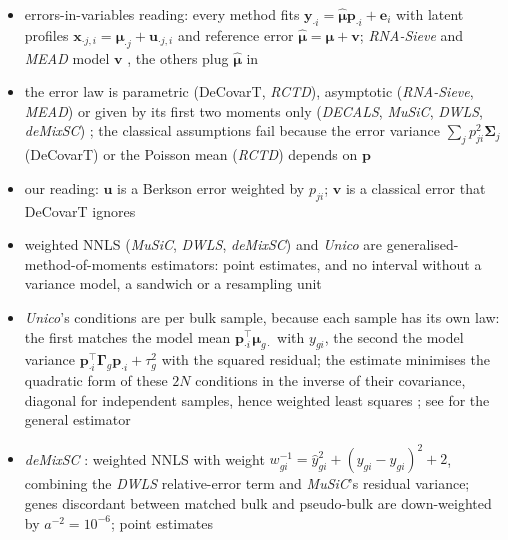 \begin{itemize}
  \item errors-in-variables reading: every method fits \(\boldsymbol{y}_{\cdot i}=\hat{\boldsymbol{\mu}}\boldsymbol{p}_{\cdot i}+\boldsymbol{e}_{i}\) with latent
        profiles \(\boldsymbol{x}_{\cdot j,i}=\boldsymbol{\mu}_{\cdot j}+\boldsymbol{u}_{\cdot j,i}\) and reference error
        \(\hat{\boldsymbol{\mu}}=\boldsymbol{\mu}+\boldsymbol{v}\); \emph{RNA-Sieve} and \emph{MEAD} model \(\boldsymbol{v}\)
        \cite{erdmann-phamLikelihoodbasedDeconvolutionBulk2021,xieStatisticalInferenceCell2026}, the others plug
        \(\hat{\boldsymbol{\mu}}\) in
  \item the error law is parametric (DeCovarT, \emph{RCTD}), asymptotic (\emph{RNA-Sieve}, \emph{MEAD}) or given by its
        first two moments only (\emph{DECALS}, \emph{MuSiC}, \emph{DWLS}, \emph{deMixSC})
        \cite{agrestiFoundationsLinearGeneralized2015}; the classical assumptions fail because the error variance
        \(\sum_{j}p_{ji}^{2}\boldsymbol{\Sigma}_{j}\) (DeCovarT) or the Poisson mean (\emph{RCTD}) depends on \(\boldsymbol{p}\)
  \item our reading: \(\boldsymbol{u}\) is a Berkson error weighted by \(p_{ji}\); \(\boldsymbol{v}\) is a classical error that
        DeCovarT ignores
  \item weighted NNLS (\emph{MuSiC}, \emph{DWLS}, \emph{deMixSC}) and \emph{Unico} are generalised-method-of-moments
        estimators: point estimates, and no interval without a variance model, a sandwich or a resampling unit
        \cite{wangBulkTissueCell2019,tsoucasAccurateEstimationCelltype2019,chenUnicoUnifiedModelCell2025}
  \item \emph{Unico}'s conditions are per bulk sample, because each sample has its own law: the first matches the model
        mean \(\boldsymbol{p}_{\cdot i}^{\top}\boldsymbol{\mu}_{g\cdot}\) with \(y_{gi}\), the second the model variance
        \(\boldsymbol{p}_{\cdot i}^{\top}\boldsymbol{\Gamma}_{g}\boldsymbol{p}_{\cdot i}+\tau_{g}^{2}\) with the squared residual; the estimate minimises the
        quadratic form of these \(2N\) conditions in the inverse of their covariance, diagonal for independent samples,
        hence weighted least squares \cite[pp.~13--14]{chenUnicoUnifiedModelCell2025}; see \cite{hansenLargeSampleProperties1982}
        for the general estimator
  \item \emph{deMixSC} \cite{guoDeMixSCDeconvolutionFramework2023}: weighted NNLS with weight
        \(w_{gi}^{-1}=\hat y_{gi}^{2}+(y_{gi}-\hat y_{gi})^{2}+2\), combining the \emph{DWLS} relative-error term and
        \emph{MuSiC}'s residual variance; genes discordant between matched bulk and pseudo-bulk are down-weighted by
        \(a^{-2}=10^{-6}\); point estimates
\end{itemize}

